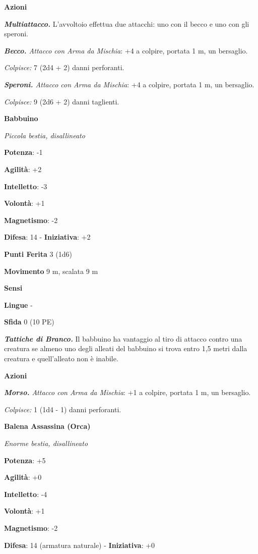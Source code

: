 \begin{multicols}{2}
\smallskip\textbf{Azioni}

\emph{\textbf{Multiattacco.}} L'avvoltoio effettua due attacchi: uno con
il becco e uno con gli speroni.

\emph{\textbf{Becco.} Attacco con Arma da Mischia}: +4 a colpire,
portata 1 m, un bersaglio.

\emph{Colpisce:} 7 (2d4 + 2) danni perforanti.

\emph{\textbf{Speroni.} Attacco con Arma da Mischia}: +4 a colpire,
portata 1 m, un bersaglio.

\emph{Colpisce:} 9 (2d6 + 2) danni taglienti.

\textbf{Babbuino}

\emph{Piccola bestia, disallineato}

\textbf{Potenza}: -1

\textbf{Agilità}: +2

\textbf{Intelletto}: -3

\textbf{Volontà}: +1

\textbf{Magnetismo}: -2

\textbf{Difesa}: 14 - \textbf{Iniziativa}: +2

\textbf{Punti Ferita} 3 (1d6)

\textbf{Movimento} 9 m, scalata 9 m

\textbf{Sensi} 

\textbf{Lingue} -

\textbf{Sfida} 0 (10 PE)\smallskip

\emph{\textbf{Tattiche di Branco.}} Il babbuino ha vantaggio al tiro di
attacco contro una creatura se almeno uno degli alleati del babbuino si
trova entro 1,5 metri dalla creatura e quell'alleato non è inabile.

\smallskip\textbf{Azioni}

\emph{\textbf{Morso.} Attacco con Arma da Mischia}: +1 a colpire,
portata 1 m, un bersaglio.

\emph{Colpisce:} 1 (1d4 - 1) danni perforanti.



\textbf{Balena Assassina (Orca)}

\emph{Enorme bestia, disallineato}

\textbf{Potenza}: +5

\textbf{Agilità}: +0

\textbf{Intelletto}: -4

\textbf{Volontà}: +1

\textbf{Magnetismo}: -2

\textbf{Difesa}: 14 (armatura naturale) - \textbf{Iniziativa}: +0


\end{multicols}

